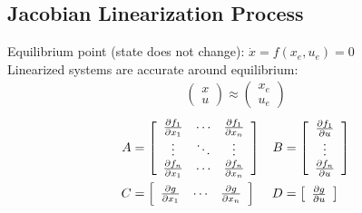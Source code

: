 \subsection*{Jacobian Linearization Process}
    Equilibrium point (state does not change): $\dot{x} = f(x_e, u_e) = 0$\\
    Linearized systems are accurate around equilibrium:
    \begin{align*}
        \left(
            \begin{array}{c}
                x\\
                u
            \end{array}
        \right)
        \approx
        \left(
            \begin{array}{c}
                x_e\\
                u_e
            \end{array}
        \right)
    \end{align*}
    \begin{align*} %
        A &= 
        \left[\begin{array}{c c c}
            \frac{\partial f_1}{\partial x_1} & \cdots & \frac{\partial f_1}{\partial x_n}\\
            \vdots & \ddots & \vdots\\
            \frac{\partial f_n}{\partial x_1} & \cdots & \frac{\partial f_n}{\partial x_n}
        \end{array}\right]
        &B &= 
        \left[\begin{array}{c}
            \frac{\partial f_1}{\partial u}\\
            \vdots\\
            \frac{\partial f_n}{\partial u}
        \end{array}\right]
        \\
        C &= 
        \left[\begin{array}{c c c}
            \frac{\partial g}{\partial x_1} & \cdots & \frac{\partial g}{\partial x_n}
        \end{array}\right]
        &D &= 
        \left[\begin{array}{c}
            \frac{\partial g}{\partial u}
        \end{array}\right]
    \end{align*}